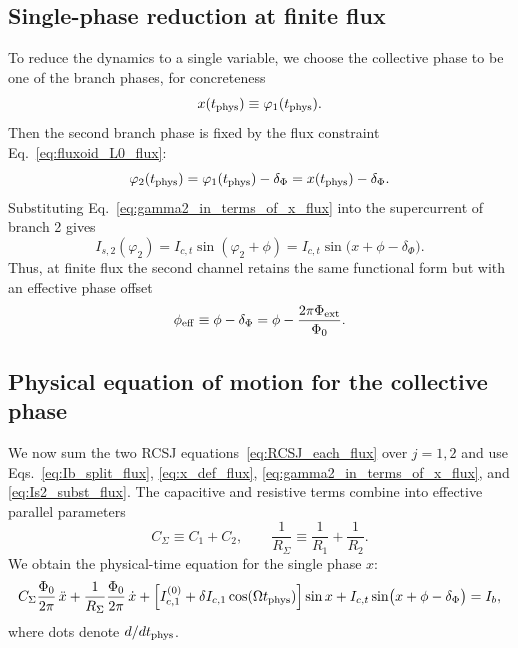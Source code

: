 \documentclass[prl,twocolumn,superscriptaddress,showpacs,nofootinbib]{revtex4-2}
\begin{document}
\subsection{Single-phase reduction at finite flux}

To reduce the dynamics to a single variable, we choose the collective phase
to be one of the branch phases, for concreteness
\begin{equation}
x(t_{\rm phys}) \equiv \varphi_1(t_{\rm phys}).
\label{eq:x_def_flux}
\end{equation}
Then the second branch phase is fixed by the flux constraint
Eq.~\eqref{eq:fluxoid_L0_flux}:
\begin{equation}
\varphi_2(t_{\rm phys}) = \varphi_1(t_{\rm phys})-\delta_\Phi
= x(t_{\rm phys})-\delta_\Phi.
\label{eq:gamma2_in_terms_of_x_flux}
\end{equation}
Substituting Eq.~\eqref{eq:gamma2_in_terms_of_x_flux} into the supercurrent of
branch 2 gives
\begin{equation}
I_{s,2}(\varphi_2)
= I_{c,t}\sin(\varphi_2+\phi)
= I_{c,t}\sin\!\big(x+\phi-\delta_\Phi\big).
\label{eq:Is2_subst_flux}
\end{equation}
Thus, at finite flux the second channel retains the same functional form but
with an effective phase offset
\begin{equation}
\phi_{\rm eff} \equiv \phi-\delta_\Phi
= \phi - \frac{2\pi \Phi_{\rm ext}}{\Phi_0}.
\label{eq:phi_eff_def}
\end{equation}

\subsection{Physical equation of motion for the collective phase}

We now sum the two RCSJ equations~\eqref{eq:RCSJ_each_flux} over $j=1,2$ and use
Eqs.~\eqref{eq:Ib_split_flux}, \eqref{eq:x_def_flux},
\eqref{eq:gamma2_in_terms_of_x_flux}, and \eqref{eq:Is2_subst_flux}.
The capacitive and resistive terms combine into effective parallel parameters
\begin{equation}
C_\Sigma \equiv C_1+C_2,
\qquad
\frac{1}{R_\Sigma}\equiv \frac{1}{R_1}+\frac{1}{R_2}.
\label{eq:Reff_Ceff_flux}
\end{equation}
We obtain the physical-time equation for the single phase $x$:
\begin{equation}
C_\Sigma\frac{\Phi_0}{2\pi}\,\ddot x
+\frac{1}{R_\Sigma}\frac{\Phi_0}{2\pi}\,\dot x
+\Big[I_{c,1}^{(0)}+\delta I_{c,1}\cos(\Omega t_{\rm phys})\Big]\sin x
+ I_{c,t}\sin\!\big(x+\phi-\delta_\Phi\big)
= I_b,
\label{eq:phys_EOM_flux}
\end{equation}
where dots denote $d/dt_{\rm phys}$.
\end{document}
